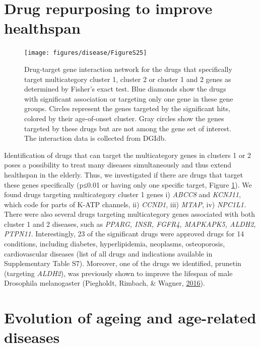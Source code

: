 \documentclass[12pt,twoside]{unicam}
\begin{document}
\hypertarget{drug-repurposing-to-improve-healthspan}{%
\section{Drug repurposing to improve healthspan}\label{drug-repurposing-to-improve-healthspan}}

\begin{figure}

{\centering \texttt{[image: figures/disease/FigureS25]} 

}

\caption[Drug-target gene interaction network for the drugs specific to multicategory age-dependent diseases.]{Drug-target gene interaction network for the drugs that specifically target multicategory cluster 1, cluster 2 or cluster 1 and 2 genes as determined by Fisher’s exact test. Blue diamonds show the drugs with significant association or targeting only one gene in these gene groups. Circles represent the genes targeted by the significant hits, colored by their age-of-onset cluster. Gray circles show the genes targeted by these drugs but are not among the gene set of interest. The interaction data is collected from DGIdb.}\label{fig:disFigS25}
\end{figure}

Identification of drugs that can target the multicategory genes in clusters 1 or 2 poses a possibility to treat many diseases simultaneously and thus extend healthspan in the elderly. Thus, we investigated if there are drugs that target these genes specifically (p≤0.01 or having only one specific target, Figure \ref{fig:disFigS25}). We found drugs targeting multicategory cluster 1 genes i) \emph{ABCC8} and \emph{KCNJ11}, which code for parts of K-ATP channels, ii) \emph{CCND1}, iii) \emph{MTAP}, iv) \emph{NPC1L1.} There were also several drugs targeting multicategory genes associated with both cluster 1 and 2 diseases, such as \emph{PPARG, INSR, FGFR4, MAPKAPK5, ALDH2, PTPN11}. Interestingly, 23 of the significant drugs were approved drugs for 14 conditions, including diabetes, hyperlipidemia, neoplasms, osteoporosis, cardiovascular diseases (list of all drugs and indications available in Supplementary Table S7). Moreover, one of the drugs we identified, prunetin (targeting \emph{ALDH2}), was previously shown to improve the lifespan of male Drosophila melanogaster (Piegholdt, Rimbach, \& Wagner, \protect\hyperlink{ref-Piegholdt2016}{2016}).

\hypertarget{evolution-of-ageing-and-age-related-diseases}{%
\section{Evolution of ageing and age-related diseases}\label{evolution-of-ageing-and-age-related-diseases}}
\end{document}
